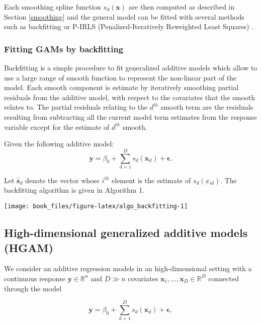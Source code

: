 \documentclass[]{book}
\begin{document}
Each smoothing spline function \(s_d(\boldsymbol{x})\) are then computed as
described in Section \ref{smoothing} and the general model can be
fitted with several methods such as backfitting or P-IRLS
(Penalized-Iteratively Reweighted Least Squares)
\citep{hastie_generalized_1990}.

\hypertarget{fitting-gams-by-backfitting}{%
\subsubsection*{Fitting GAMs by backfitting}\label{fitting-gams-by-backfitting}}

Backfitting is a simple procedure to fit generalized additive models
which allow to use a large range of smooth function to represent the
non-linear part of the model. Each smooth component is estimate by
iteratively smoothing partial residuals from the additive model, with
respect to the covariates that the smooth relates to. The partial
residuals relating to the \(d^{th}\) smooth term are the residuals
resulting from subtracting all the current model term estimates from the
response variable except for the estimate of \(d^{th}\) smooth.

Given the following additive model:
\[\mathbf{y} = \beta_0 + \sum_{d=1}^D s_d(\boldsymbol{x}_d) + \boldsymbol{\epsilon}.\]

Let \(\hat{\mathbf{s}}_d\) denote the vector whose \(i^{th}\) element is the
estimate of \(s_d(x_{id})\). The backfitting algorithm is given in
Algorithm 1.

\begin{center}\texttt{[image: book\_files/figure-latex/algo\_backfitting-1]} \end{center}

\hypertarget{hgam}{%
\subsection{High-dimensional generalized additive models (HGAM)}\label{hgam}}

We consider an additive regression models in an high-dimensional setting
with a continuous response \(\mathbf{y} \in \mathbb{R}^n\) and \(D \gg n\)
covariates \(\boldsymbol{x}_1, \dots, \boldsymbol{x}_D \in \mathbb{R}^D\) connected through
the model

\[\mathbf{y} = \beta_0 + \sum_{d=1}^D s_d(\boldsymbol{x}_d) + \boldsymbol{\epsilon},\]
\end{document}
